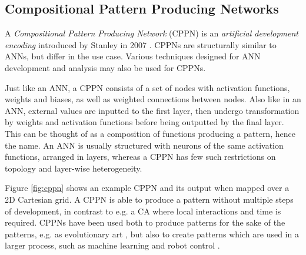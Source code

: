 \subsection{Compositional Pattern Producing Networks}
A \textit{Compositional Pattern Producing Network} (CPPN) is an \textit{artificial development encoding} introduced by Stanley in 2007 \cite{stanley-2007}.
CPPNs are structurally similar to ANNs, but differ in the use case.
Various techniques designed for ANN development and analysis may also be used for CPPNs.

Just like an ANN, a CPPN consists of a set of nodes with activation functions, weights and biases, as well as weighted connections between nodes.
Also like in an ANN, external values are inputted to the first layer, then undergo transformation by weights and activation functions before being outputted by the final layer.
This can be thought of as a composition of functions producing a pattern, hence the name.
An ANN is usually structured with neurons of the same activation functions,
arranged in layers,
whereas a CPPN has few such restrictions on topology and layer-wise heterogeneity.


Figure \ref{fig:cppn} shows an example CPPN and its output when mapped over a 2D Cartesian grid.
A CPPN is able to produce a pattern without multiple steps of development,
in contrast to e.g. a CA where local interactions and time is required.
CPPNs have been used both to produce patterns for the sake of the patterns, e.g. as evolutionary art \cite{stanley2006exploiting},
but also to create patterns which are used in a larger process,
such as machine learning \cite{d2008generative} and robot control \cite{risi2013confronting}.

